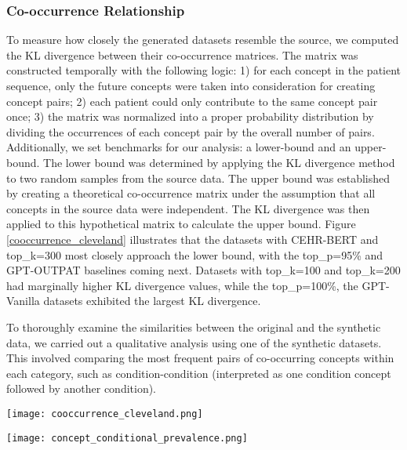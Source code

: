 \begin{multicols}{2}
\subsubsection{Co-occurrence Relationship}
To measure how closely the generated datasets resemble the source, we computed the KL divergence between their co-occurrence matrices. The matrix was constructed temporally with the following logic: 1) for each concept in the patient sequence, only the future concepts were taken into consideration for creating concept pairs; 2) each patient could only contribute to the same concept pair once; 3) the matrix was normalized into a proper probability distribution by dividing the occurrences of each concept pair by the overall number of pairs. Additionally, we set benchmarks for our analysis: a lower-bound and an upper-bound. The lower bound was determined by applying the KL divergence method to two random samples from the source data. The upper bound was established by creating a theoretical co-occurrence matrix under the assumption that all concepts in the source data were independent. The KL divergence was then applied to this hypothetical matrix to calculate the upper bound. Figure \ref{cooccurrence_cleveland} illustrates that the datasets with CEHR-BERT and top\_k=300 most closely approach the lower bound, with the top\_p=95\% and GPT-OUTPAT baselines coming next. Datasets with top\_k=100 and top\_k=200 had marginally higher KL divergence values, while the top\_p=100\%, the GPT-Vanilla datasets exhibited the largest KL divergence. 

To thoroughly examine the similarities between the original and the synthetic data, we carried out a qualitative analysis using one of the synthetic datasets. This involved comparing the most frequent pairs of co-occurring concepts within each category, such as condition-condition (interpreted as one condition concept followed by another condition). 

\begin{Figure}
    \texttt{[image: cooccurrence\_cleveland.png]}
    \label{cooccurrence_cleveland}
\end{Figure}

\begin{Figure}
    \texttt{[image: concept\_conditional\_prevalence.png]}
    \label{concept_conditional_prevalence}
\end{Figure}


\end{multicols}
